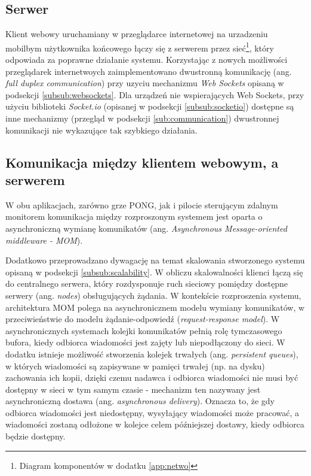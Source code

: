 \subsection{Serwer}

Klient webowy uruchamiany w przeglądarce internetowej na urzadzeniu mobilbym użytkownika końcowego łączy się z serwerem przez sieć\footnote{Diagram komponentów w dodatku \ref{app:netwo}}, który odpowiada za poprawne działanie systemu. Korzystając z nowych możliwości przeglądarek internetwoych zaimplementowano dwustronną komunikację (ang. \emph{full duplex communication}) przy uzyciu mechanizmu \emph{Web Sockets}\cite{websockets-rfc} opisaną w podsekcji \ref{subsub:websockets}. Dla urządzeń nie wspierających Web Sockets, przy użyciu biblioteki \emph{Socket.io} (opisanej w podsekcji \ref{subsub:socketio}) dostępne są inne mechanizmy (przegląd w podsekcji \ref{sub:communication}) dwustronnej komunikacji nie wykazujące tak szybkiego działania.

\subsection{Komunikacja między klientem webowym, a serwerem}
\label{sub:communication-methods}

W obu aplikacjach, zarówno grze PONG, jak i pilocie sterującym zdalnym monitorem komunikacja między rozproszonym systemem jest oparta o asynchroniczną wymianę komunikatów (ang. \emph{Asynchronous Message-oriented middleware - MOM})\cite{message-oriented-middleware}.

Dodatkowo przeprowadzano dywagację na temat skalowania stworzonego systemu opisaną w podsekcji \ref{subsub:scalability}. W obliczu skalowalności klienci łączą się do centralnego serwera, który rozdysponuje ruch sieciowy pomiędzy dostępne serwery (ang. \emph{nodes}) obsługujących żądania. W kontekście rozproszenia systemu, architektura MOM polega na asynchronicznem modelu wymiany komunikatów, w przeciwieństwie do modelu żądanie-odpowiedź (\emph{request-response model}). W asynchronicznych systemach kolejki komunikatów pełnią rolę tymczasowego bufora, kiedy odbiorca wiadomości jest zajęty lub niepodłączony do sieci. W dodatku istnieje możliwość stworzenia kolejek trwałych (ang. \emph{persistent queues}), w których wiadomości są zapisywane w pamięci trwałej (np. na dysku) zachowania ich kopii, dzięki czemu nadawca i odbiorca wiadomości nie musi być dostępny w sieci w tym samym czasie - mechanizm ten nazywany jest asynchroniczną dostawa (ang. \emph{asynchronous delivery}). Oznacza to, że gdy odbiorca wiadomości jest niedostępny, wysyłający wiadomości może pracować, a wiadomości zostaną odłożone w kolejce celem późniejszej dostawy, kiedy odbiorca będzie dostępny.

